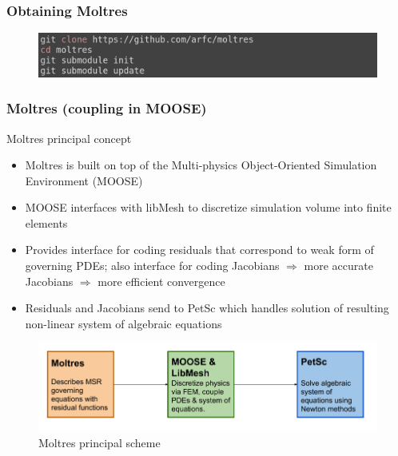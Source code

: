 \begin{frame}
	\frametitle{Obtaining Moltres}
               \begin{figure}[t]
                \includegraphics[height=0.15\textwidth]{./images/clone_moltres.png}
               \end{figure}   
\end{frame}



\begin{frame}
  \frametitle{Moltres (coupling in MOOSE)}
   \begin{block}{Moltres principal concept \cite{lindsay_introduction_2018}}
     \begin{itemize}
        \item Moltres is built on top of the Multi-physics Object-Oriented
Simulation Environment (MOOSE)
		\item MOOSE interfaces with libMesh to discretize simulation volume
into finite elements
		\item Provides interface for coding residuals that correspond to weak
form of governing PDEs; also interface for coding Jacobians $\Rightarrow$
more accurate Jacobians $\Rightarrow$ more efficient convergence
		\item Residuals and Jacobians send to PetSc which handles solution of resulting non-linear system of algebraic equations
     \end{itemize}
    \end{block}
               \begin{figure}[t]
                \vspace*{-0.15in}
                \includegraphics[height=0.24\textwidth]{./images/moltres-moose-diag.png}
                \vspace*{-0.1in}
                \caption{Moltres principal scheme}
               \end{figure}   
\end{frame}

